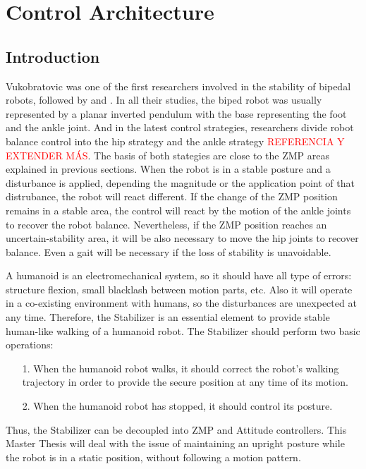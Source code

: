 \chapter{Control Architecture}
\section{Introduction}
Vukobratovic \cite{Vuk1970} was one of the first researchers involved in the stability of bipedal robots, followed by \cite{Kaj2001} and \cite{Kim2004}. In all their studies, the biped robot was usually represented by a planar inverted pendulum with the base representing the foot and the ankle joint. And in the latest control strategies, researchers divide robot balance control into the hip strategy and the ankle strategy \textcolor{red}{REFERENCIA Y EXTENDER MÁS}. The basis of both stategies are close to the ZMP areas explained in previous sections. When the robot is in a stable posture and a disturbance is applied, depending the magnitude or the application point of that distrubance, the robot will react different. If the change of the ZMP position remains in a stable area, the control will react by the motion of the ankle joints to recover the robot balance. Nevertheless, if the ZMP position reaches an uncertain-stability area, it will be also necessary to move the hip joints to recover balance. Even a gait will be necessary if the loss of stability is unavoidable. 

A humanoid is an electromechanical system, so it should have all type of errors: structure flexion, small blacklash between motion parts, etc. Also it will operate in a co-existing environment with humans, so the disturbances are unexpected at any time. Therefore, the Stabilizer is an essential element to provide stable human-like walking of a humanoid robot. The Stabilizer should perform two basic operations:
\begin{itemize}
\item[1.] When the humanoid robot walks, it should correct the robot’s walking trajectory in order to provide the secure position at any time of its motion.
\item[2.] When the humanoid robot has stopped, it should control its posture.
\end{itemize}

Thus, the Stabilizer can be decoupled into ZMP and Attitude controllers. This Master Thesis will deal with the issue of maintaining an upright posture while the robot is in a static position, without following a motion pattern.







